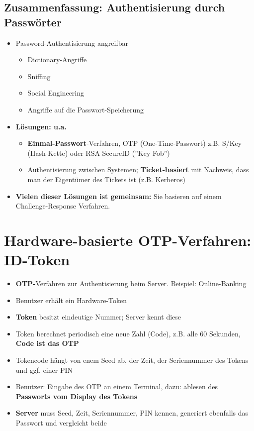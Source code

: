 \documentclass[openany]{book}
\begin{document}
\newpage

\subsection{Zusammenfassung: Authentisierung durch Passwörter}

\begin{itemize}
    \item Password-Authentisierung angreifbar
    \begin{itemize}
        \item Dictionary-Angriffe
        \item Sniffing
        \item Social Engineering
        \item Angriffe auf die Passwort-Speicherung
    \end{itemize}
    \item \textbf{Lösungen: u.a.}
    \begin{itemize}
        \item \textbf{Einmal-Passwort}-Verfahren, OTP (One-Time-Passwort) z.B. S/Key (Hash-Kette) oder RSA SecureID (''Key Fob'')
        \item Authentisierung zwischen Systemen; \textbf{Ticket-basiert} mit Nachweis, dass man der Eigentümer des Tickets ist (z.B. Kerberos)
    \end{itemize}
    \item \textbf{Vielen dieser Lösungen ist gemeinsam:} Sie basieren auf einem Challenge-Response Verfahren.
\end{itemize}

\section{Hardware-basierte OTP-Verfahren: ID-Token}

\begin{itemize}
    \item \textbf{OTP-}Verfahren zur Authentisierung beim Server. Beispiel: Online-Banking
    \item Benutzer erhält ein Hardware-Token
    \item \textbf{Token} besitzt eindeutige Nummer; Server kennt diese
    \item Token berechnet periodisch eine neue Zahl (Code), z.B. alle 60 Sekunden, \textbf{Code ist das OTP}
    \item Tokencode hängt von enem Seed ab, der Zeit, der Seriennummer des Tokens und ggf. einer PIN
    \item Benutzer: Eingabe des OTP an einem Terminal, dazu: ablesen des \textbf{Passworts vom Display des Tokens}
    \item \textbf{Server} muss Seed, Zeit, Seriennummer, PIN kennen, generiert ebenfalls das Passwort und vergleicht beide
\end{itemize}
\end{document}
